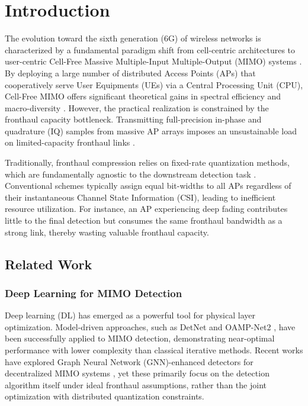 \section{Introduction}

The evolution toward the sixth generation (6G) of wireless networks is characterized by a fundamental paradigm shift from cell-centric architectures to user-centric Cell-Free Massive Multiple-Input Multiple-Output (MIMO) systems \cite{Ngo2017CellFree, Bjornson2020Scalable}. By deploying a large number of distributed Access Points (APs) that cooperatively serve User Equipments (UEs) via a Central Processing Unit (CPU), Cell-Free MIMO offers significant theoretical gains in spectral efficiency and macro-diversity \cite{Interdonato2019Ubiquitous}. However, the practical realization is constrained by the fronthaul capacity bottleneck. Transmitting full-precision in-phase and quadrature (IQ) samples from massive AP arrays imposes an unsustainable load on limited-capacity fronthaul links \cite{Bashar2019Fronthaul, Masoumi2020Performance}.

Traditionally, fronthaul compression relies on fixed-rate quantization methods, which are fundamentally agnostic to the downstream detection task \cite{Schibisch2018OnlineLQ}. Conventional schemes typically assign equal bit-widths to all APs regardless of their instantaneous Channel State Information (CSI), leading to inefficient resource utilization. For instance, an AP experiencing deep fading contributes little to the final detection but consumes the same fronthaul bandwidth as a strong link, thereby wasting valuable fronthaul capacity.

\subsection{Related Work}
\subsubsection{Deep Learning for MIMO Detection}
Deep learning (DL) has emerged as a powerful tool for physical layer optimization. Model-driven approaches, such as DetNet \cite{Samuel2019DetNet} and OAMP-Net2 \cite{He2020OAMPNet}, have been successfully applied to MIMO detection, demonstrating near-optimal performance with lower complexity than classical iterative methods. Recent works have explored Graph Neural Network (GNN)-enhanced detectors for decentralized MIMO systems \cite{Wei2020LearnedCG}, yet these primarily focus on the detection algorithm itself under ideal fronthaul assumptions, rather than the joint optimization with distributed quantization constraints.

